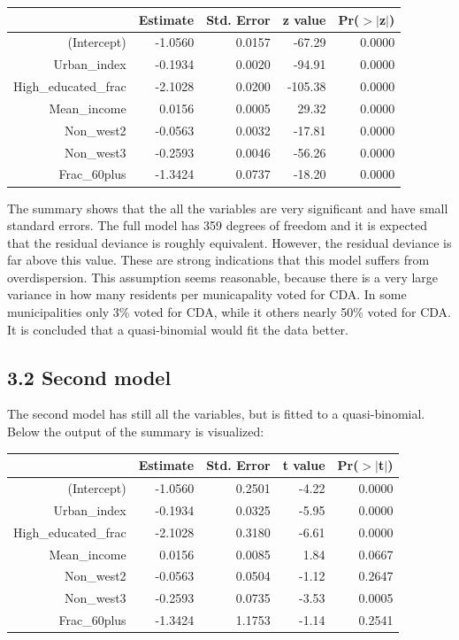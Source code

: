\documentclass[11pt,]{article}
\begin{document}
\begin{table}[ht]
\centering
\begin{tabular}{rrrrr}
  \hline
 & Estimate & Std. Error & z value & Pr($>$$|$z$|$) \\ 
  \hline
(Intercept) & -1.0560 & 0.0157 & -67.29 & 0.0000 \\ 
  Urban\_index & -0.1934 & 0.0020 & -94.91 & 0.0000 \\ 
  High\_educated\_frac & -2.1028 & 0.0200 & -105.38 & 0.0000 \\ 
  Mean\_income & 0.0156 & 0.0005 & 29.32 & 0.0000 \\ 
  Non\_west2 & -0.0563 & 0.0032 & -17.81 & 0.0000 \\ 
  Non\_west3 & -0.2593 & 0.0046 & -56.26 & 0.0000 \\ 
  Frac\_60plus & -1.3424 & 0.0737 & -18.20 & 0.0000 \\ 
   \hline
\end{tabular}
\end{table}

The summary shows that the all the variables are very significant and
have small standard errors. The full model has 359 degrees of freedom
and it is expected that the residual deviance is roughly equivalent.
However, the residual deviance is far above this value. These are strong
indications that this model suffers from overdispersion. This assumption
seems reasonable, because there is a very large variance in how many
residents per municapality voted for CDA. In some municipalities only
3\% voted for CDA, while it others nearly 50\% voted for CDA. It is
concluded that a quasi-binomial would fit the data better.

\subsection{3.2 Second model}\label{second-model-1}

The second model has still all the variables, but is fitted to a
quasi-binomial. Below the output of the summary is visualized:

\begin{table}[ht]
\centering
\begin{tabular}{rrrrr}
  \hline
 & Estimate & Std. Error & t value & Pr($>$$|$t$|$) \\ 
  \hline
(Intercept) & -1.0560 & 0.2501 & -4.22 & 0.0000 \\ 
  Urban\_index & -0.1934 & 0.0325 & -5.95 & 0.0000 \\ 
  High\_educated\_frac & -2.1028 & 0.3180 & -6.61 & 0.0000 \\ 
  Mean\_income & 0.0156 & 0.0085 & 1.84 & 0.0667 \\ 
  Non\_west2 & -0.0563 & 0.0504 & -1.12 & 0.2647 \\ 
  Non\_west3 & -0.2593 & 0.0735 & -3.53 & 0.0005 \\ 
  Frac\_60plus & -1.3424 & 1.1753 & -1.14 & 0.2541 \\ 
   \hline
\end{tabular}
\end{table}
\end{document}
